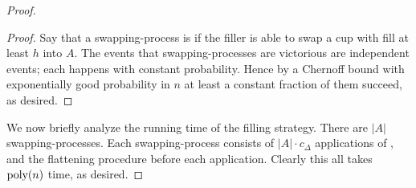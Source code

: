 \begin{proof}
\begin{proof}
  Say that a swapping-process is  if the filler
  is able to swap a cup with fill at least $h$ into $A$. The
  events that swapping-processes are victorious are independent
  events; each happens with constant probability. Hence by a
  Chernoff bound with exponentially good probability in $n$ at
  least a constant fraction of them succeed, as desired.

\end{proof}

We now briefly analyze the running time of the filling strategy.
There are $|A|$ swapping-processes. Each swapping-process
consists of $|A|\cdot c_\Delta$ applications of \randalg, and
the flattening procedure before each application. 
Clearly this all takes $\operatorname{\text{poly}}(n)$ time, as desired.
  
\end{proof}

